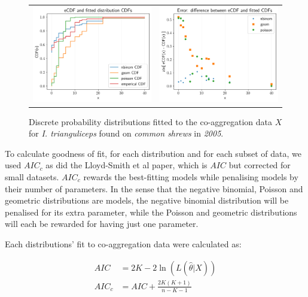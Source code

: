 \documentclass{article}
\begin{document}
\begin{figure}[]
	\begin{mdframed}[backgroundcolor=grey250,rightline=false,leftline=false,topline=false]
	\centering
	\begin{tabular}{ll}
	\includegraphics[width=.48\linewidth,valign=m]{CDF_compare_2005_I.trianguliceps_SA} & \includegraphics[width=.48\linewidth,valign=m]{CDF_errors_2005_I.trianguliceps_SA}
	\end{tabular}
		\caption{Discrete probability distributions fitted to the co-aggregation data $ X $ for \textit{I. trianguliceps} found on \textit{common shrews} in \textit{2005}.}
	\label{fig:CDF_2005_itrianguliceps_SA}
	\end{mdframed}
\end{figure}

To calculate goodness of fit, for each distribution and for each subset of data, we used $ AIC_c $ as did the Lloyd-Smith et al paper, which is $ AIC $ but corrected for small datasets. $ AIC_c $ rewards the best-fitting models while penalising models by their number of parameters. In the sense that the negative binomial, Poisson and geometric distributions are models, the negative binomial distribution will be penalised for its extra parameter, while the Poisson and geometric distributions will each be rewarded for having just one parameter. 

Each distributions' fit to co-aggregation data were calculated as:

\begin{align} \label{AIC}
    AIC &= 2K - 2\ln(L(\hat \theta | X)) \nonumber \\
    AIC_c &= AIC + \frac{2K(K+1)}{n-K-1}
\end{align}
\end{document}
